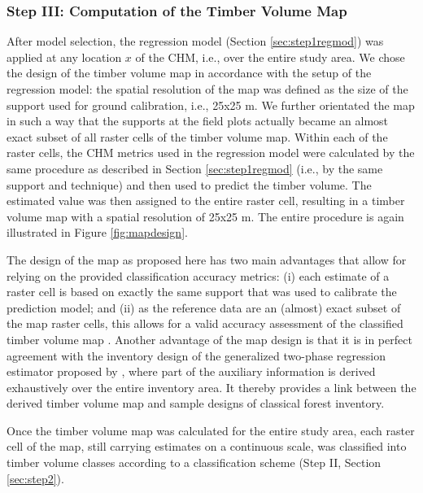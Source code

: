 \subsubsection{Step III: Computation of the Timber Volume Map}
\label{sec:step3}

After model selection, the regression model (Section \ref{sec:step1regmod}) was applied at any location $x$ of the CHM, i.e., over the entire study area. We chose the design of the timber volume map in accordance with the setup of the regression model: the spatial resolution of the map was defined as the size of the support used for ground calibration, i.e., 25x25 m. We further orientated the map in such a way that the supports at the field plots actually became an almost exact subset of all raster cells of the timber volume map. Within each of the raster cells, the CHM metrics used in the regression model were calculated by the same procedure as described in Section \ref{sec:step1regmod} (i.e., by the same support and technique) and then used to predict the timber volume. The estimated value was then assigned to the entire raster cell, resulting in a timber volume map with a spatial resolution of 25x25 m. The entire procedure is again illustrated in Figure \ref{fig:mapdesign}.\par
The design of the map as proposed here has two main advantages that allow for relying on the provided classification accuracy metrics: (i) each estimate of a raster cell is based on exactly the same support that was used to calibrate the prediction model; and (ii) as the reference data are an (almost) exact subset of the map raster cells, this allows for a valid accuracy assessment of the classified timber volume map \citep{congalton2008}. Another advantage of the map design is that it is in perfect agreement with the inventory design of the generalized two-phase regression estimator proposed by \citet{mandallaz2013b}, where part of the auxiliary information is derived exhaustively over the entire inventory area. It thereby provides a link between the derived timber volume map and sample designs of classical forest inventory.\par
Once the timber volume map was calculated for the entire study area, each raster cell of the map, still carrying estimates on a continuous scale, was classified into timber volume classes according to a classification scheme (Step II, Section \ref{sec:step2}).

